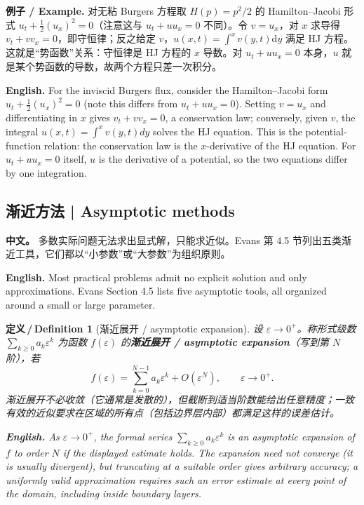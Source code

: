 \documentclass[UTF8,11pt,a4paper]{ctexart}
\newcommand{\APS}[2]{\par\noindent\textbf{中文。} #1\par\noindent\textbf{English.} #2\par\smallskip}
\newcommand{\EN}[1]{\par\noindent \textbf{English.} #1\par}
\newcommand{\EX}[2]{\par\noindent \textbf{例子 / Example.} #1\par\EN{#2}}
\newtheorem{definition}{定义\,/\,Definition}[section]
\newcommand{\dd}{\mathrm{d}}
\begin{document}
\EX{对无粘 Burgers 方程取 $H(p)=p^2/2$ 的 Hamilton--Jacobi 形式 $u_t+\frac12(u_x)^2=0$（注意这与 $u_t+uu_x=0$ 不同）。令 $v=u_x$，对 $x$ 求导得 $v_t+vv_x=0$，即守恒律；反之给定 $v$，$u(x,t)=\int^xv(y,t)\dd y$ 满足 HJ 方程。这就是``势函数''关系：守恒律是 HJ 方程的 $x$ 导数。对 $u_t+uu_x=0$ 本身，$u$ 就是某个势函数的导数，故两个方程只差一次积分。}{For the inviscid Burgers flux, consider the Hamilton--Jacobi form $u_t+\frac12(u_x)^2=0$ (note this differs from $u_t+uu_x=0$). Setting $v=u_x$ and differentiating in $x$ gives $v_t+vv_x=0$, a conservation law; conversely, given $v$, the integral $u(x,t)=\int^xv(y,t)dy$ solves the HJ equation. This is the potential-function relation: the conservation law is the $x$-derivative of the HJ equation. For $u_t+uu_x=0$ itself, $u$ is the derivative of a potential, so the two equations differ by one integration.}

\subsection{渐近方法 | Asymptotic methods}
\APS{多数实际问题无法求出显式解，只能求近似。Evans 第 4.5 节列出五类渐近工具，它们都以``小参数''或``大参数''为组织原则。}{Most practical problems admit no explicit solution and only approximations. Evans Section 4.5 lists five asymptotic tools, all organized around a small or large parameter.}

\begin{definition}[渐近展开 / asymptotic expansion]\label{def:asymptotic}
设 $\varepsilon\to0^+$。称形式级数 $\sum_{k\ge0}a_k\varepsilon^k$ 为函数 $f(\varepsilon)$ 的\textbf{渐近展开 / asymptotic expansion}（写到第 $N$ 阶），若
\[
f(\varepsilon)=\sum_{k=0}^{N-1}a_k\varepsilon^k+O(\varepsilon^N),\qquad \varepsilon\to0^+ .
\]
渐近展开不必收敛（它通常是发散的），但截断到适当阶数能给出任意精度；一致有效的近似要求在区域的所有点（包括边界层内部）都满足这样的误差估计。
\EN{As $\varepsilon\to0^+$, the formal series $\sum_{k\ge0}a_k\varepsilon^k$ is an asymptotic expansion of $f$ to order $N$ if the displayed estimate holds. The expansion need not converge (it is usually divergent), but truncating at a suitable order gives arbitrary accuracy; a uniformly valid approximation requires such an error estimate at every point of the domain, including inside boundary layers.}
\end{definition}
\end{document}
